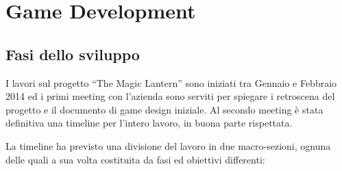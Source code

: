 \chapter{Game Development}
\label{chap:game_development}

\section{Fasi dello sviluppo}
\label{sec:dev_fasi_sviluppo}

I lavori sul progetto ``The Magic Lantern'' sono iniziati tra Gennaio e Febbraio 2014 ed i primi meeting con l'azienda sono serviti per spiegare i retroscena del progetto e il documento di game design iniziale.
Al secondo meeting è stata definitiva una timeline per l'intero lavoro, in buona parte rispettata. 

La timeline ha previsto una divisione del lavoro in due macro-sezioni, ognuna delle quali a sua volta costituita da fasi ed obiettivi differenti:

